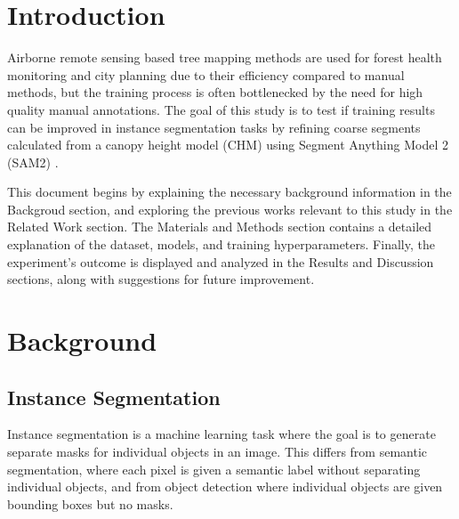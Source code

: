 \documentclass[english, 12pt, a4paper, sci, utf8, a-2b, online]{aaltothesis}
\begin{document}
\cleardoublepage

\section{Introduction}
\label{sec:intro}

\thispagestyle{empty}

Airborne remote sensing based tree mapping methods are used for forest health monitoring \cite{ecke} and city planning \cite{velasquez} due to their efficiency compared to manual methods, but the training process is often bottlenecked by the need for high quality manual annotations. 
The goal of this study is to test if training results can be improved in instance segmentation tasks by refining coarse segments calculated from a canopy height model (CHM) using Segment Anything Model 2 (SAM2) \cite{sam2}.

This document begins by explaining the necessary background information in the Backgroud section, and exploring the previous works relevant to this study in the Related Work section. The Materials and Methods section contains a detailed explanation of the dataset, models, and training hyperparameters. Finally, the experiment's outcome is displayed and analyzed in the Results and Discussion sections, along with suggestions for future improvement.

\newpage
\section{Background}

\subsection{Instance Segmentation}

Instance segmentation is a machine learning task where the goal is to generate separate masks for individual objects in an image. This differs from semantic segmentation, where each pixel is given a semantic label without separating individual objects, and from object detection where individual objects are given bounding boxes but no masks.
\newline
{}
\newline
\end{document}
